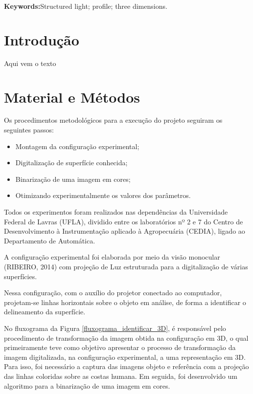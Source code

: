 \documentclass[a4paper, 12pt]{article}
\begin{document}
\textbf{Keywords:}Structured light; profile; three dimensions. 



\section{Introdução}

Aqui vem o texto



\section{Material e Métodos}

Os procedimentos metodológicos para a execução do projeto seguiram os seguintes passos:

\begin{itemize}
\item Montagem da configuração experimental;

\item Digitalização de superfície conhecida;

\item Binarização de uma imagem em cores;

\item Otimizando experimentalmente os valores dos parâmetros. 
\end{itemize}

Todos os experimentos foram realizados nas dependências da Universidade Federal de Lavras (UFLA), dividido entre os laboratórios nº 2 e 7 do Centro de Desenvolvimento à Instrumentação aplicado à Agropecuária (CEDIA), ligado ao Departamento de Automática.

A configuração experimental foi elaborada por meio da visão monocular (RIBEIRO, 2014) com projeção de Luz estruturada para a digitalização de várias superfícies.

Nessa configuração, com o auxílio do projetor conectado ao computador, projetam-se linhas horizontais sobre o objeto em análise, de forma a identificar o delineamento da superfície.


No fluxograma da Figura \ref{fluxograma_identificar_3D}, é responsável pelo procedimento de transformação da imagem obtida na configuração em 3D, o qual primeiramente teve como objetivo apresentar o processo de transformação da imagem digitalizada, na configuração experimental, a uma representação em 3D. Para isso, foi necessário a captura das imagens objeto e referência com a projeção das linhas coloridas sobre as costas humana. Em seguida, foi desenvolvido um algoritmo para a binarização de uma imagem em cores.
\end{document}
